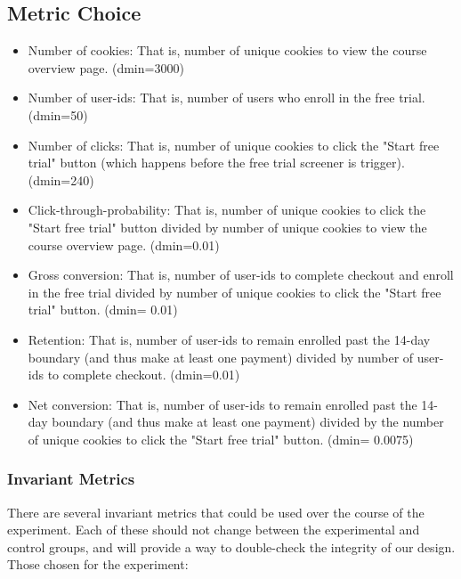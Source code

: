 \documentclass[paper=a4, fontsize=11pt]{scrartcl} %
\numberwithin{equation}{section} %
\numberwithin{figure}{section} %
\numberwithin{table}{section} %
\begin{document}

\subsection{Metric Choice}

\begin{itemize}
	\item Number of cookies: That is, number of unique cookies to view the course overview page. (dmin=3000)
	\item Number of user-ids: That is, number of users who enroll in the free trial. (dmin=50)
	\item Number of clicks: That is, number of unique cookies to click the "Start free trial" button (which happens before the free trial screener is trigger). (dmin=240)
	\item Click-through-probability: That is, number of unique cookies to click the "Start free trial" button divided by number of unique cookies to view the course overview page. (dmin=0.01)
	\item Gross conversion: That is, number of user-ids to complete checkout and enroll in the free trial divided by number of unique cookies to click the "Start free trial" button. (dmin= 0.01)
	\item Retention: That is, number of user-ids to remain enrolled past the 14-day boundary (and thus make at least one payment) divided by number of user-ids to complete checkout. (dmin=0.01)
	\item Net conversion: That is, number of user-ids to remain enrolled past the 14-day boundary (and thus make at least one payment) divided by the number of unique cookies to click the "Start free trial" button. (dmin= 0.0075) \newline
\end{itemize}


\subsubsection{Invariant Metrics}

There are several invariant metrics that could be used over the course of the experiment.  Each of these should not change between the experimental and control groups, and will provide a way to double-check the integrity of our design.  Those chosen for the experiment:
\end{document}
